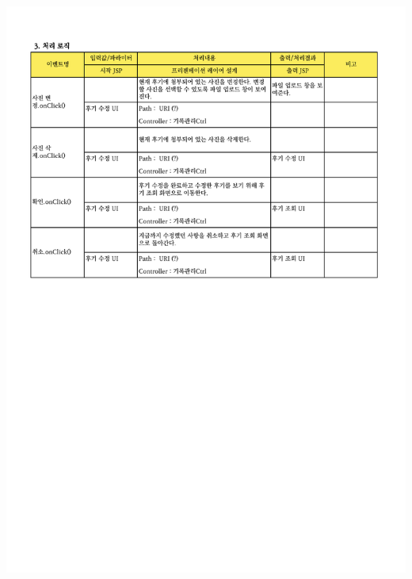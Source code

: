 {{{{{{{{{{{{{{{{{{{{{{{{{{{{{{{{{{{{{{{{{{{{{{{{{{{{{{{{{{{{{{{{{{{{{{{{{{{\includegraphics[width=20cm]{./Figure/Design/Display/review/review_06.pdf} \\
}}}}}}}}}}}}}}}}}}}}}}}}}}}}}}}}}}}}}}}}}}}}}}}}}}}}}}}}}}}}}}}}}}}}}}}}}}}
